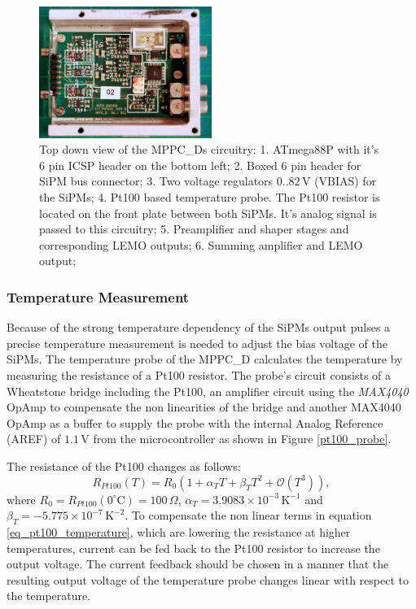 \documentclass[]{article}
\begin{document}
	\begin{figure}[t]
		\centering
			\includegraphics[width=0.5\textwidth]{Figures/weinstock/mppc_d_titled.png}
		\caption{Top down view of the MPPC\_Ds circuitry: 1. ATmega88P with it's 6 pin ICSP header on the bottom left; 
								  2. Boxed 6 pin header for SiPM bus connector;
								  3. Two voltage regulators $0..82\,\text{V}$ (VBIAS) for the SiPMs;
								  4. Pt100 based temperature probe. The Pt100 resistor is located on the front plate between both SiPMs. 
								       It's analog signal is passed to this circuitry;
								  5. Preamplifier and shaper stages and corresponding LEMO outputs; 
								  6. Summing amplifier and LEMO output;
			}
		\label{mppc_top}
	\end{figure}	

\newpage

\subsubsection{Temperature Measurement}

Because of the strong temperature dependency of the SiPMs output pulses a precise temperature measurement is needed to adjust the bias voltage of the SiPMs. The temperature probe of
the MPPC\_D calculates the temperature by measuring the resistance of a Pt100 resistor. The probe's circuit consists of a Wheatstone bridge including the Pt100, an amplifier circuit using
the \emph{MAX4040} OpAmp to compensate the non linearities of the bridge and another MAX4040 OpAmp as a buffer to supply the probe with the
internal Analog Reference (AREF) of $1.1\,\text{V}$ from the microcontroller as shown in Figure \ref{pt100_probe}.

The resistance of the Pt100 changes as follows:
	\begin{equation}
		R_{Pt100}(T) = R_0(1 +\alpha_T T + \beta_T T^2 + \mathcal{O}(T^3)),
		\label{eq_pt100_temperature}
	\end{equation}
where $R_0 = R_{Pt100}(0^{\circ} \text{C})=100\,\Omega$, $\alpha_T = 3.9083 \times 10^{-3}\, \text{K}^{-1}$ and $\beta_T = -5.775 \times 10^{-7}\, \text{K}^{-2}$. To compensate 
the non linear terms in equation \ref{eq_pt100_temperature}, which are lowering the resistance at higher temperatures, current can be fed back to the Pt100 resistor to increase 
the output voltage. The current feedback should be chosen in a manner that the resulting output voltage of the temperature probe changes linear with respect to the temperature.
\end{document}
